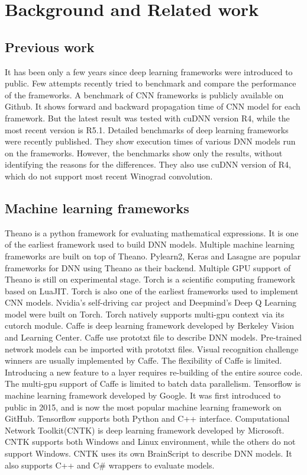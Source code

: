 \section{Background and Related work}

\subsection{Previous work}
It has been only a few years since deep learning frameworks were introduced to public.
Few attempts recently tried to benchmark and compare the performance of the frameworks.
A benchmark of CNN frameworks is publicly available on Github\cite{convnet-benchmarks}.
It shows forward and backward propagation time of CNN model for each framework.
But the latest result was tested with cuDNN version R4, while the most recent version is R5.1.
Detailed benchmarks of deep learning frameworks were recently published\cite{DBLP:journals/corr/BahrampourRSS15, DBLP:journals/corr/ShiWXC16}.
They show execution times of various DNN models run on the frameworks.
However, the benchmarks show only the results, without identifying the reasons for the differences.
They also use cuDNN version of R4, which do not support most recent Winograd convolution.


\subsection{Machine learning frameworks}

Theano is a python framework for evaluating mathematical expressions\cite{DBLP:journals/corr/Al-RfouAAa16}.
It is one of the earliest framework used to build DNN models.
Multiple machine learning frameworks are built on top of Theano.
Pylearn2, Keras and Lasagne are popular frameworks for DNN using Theano as their backend.
Multiple GPU support of Theano is still on experimental stage.
Torch is a scientific computing framework based on LuaJIT\cite{torch}.
Torch is also one of the earliest frameworks used to implement CNN models.
Nvidia's self-driving car project and Deepmind's Deep Q Learning model were built on Torch\cite{nvdave, mnih2015humanlevel}.
Torch natively supports multi-gpu context via its cutorch module.
Caffe is deep learning framework developed by Berkeley Vision and Learning Center\cite{jia2014caffe}.
Caffe use prototxt file to describe DNN models.
Pre-trained network models can be imported with prototxt files.
Visual recognition challenge winners are usually implemented by Caffe\cite{ILSVRC15, RCNN, vgg}.
The flexibility of Caffe is limited.
Introducing a new feature to a layer requires re-building of the entire source code.
The multi-gpu support of Caffe is limited to batch data parallelism.
Tensorflow is machine learning framework developed by Google\cite{tensorflow2015-whitepaper}.
It was first introduced to public in 2015, and is now the most popular machine learning framework on GitHub.
Tensorflow supports both Python and C++ interface.
Computational Network Toolkit(CNTK) is deep learning framework developed by Microsoft\cite{cntk}.
CNTK supports both Windows and Linux environment, while the others do not support Windows.
CNTK uses its own BrainScript to describe DNN models.
It also supports C++ and C\# wrappers to evaluate models.

